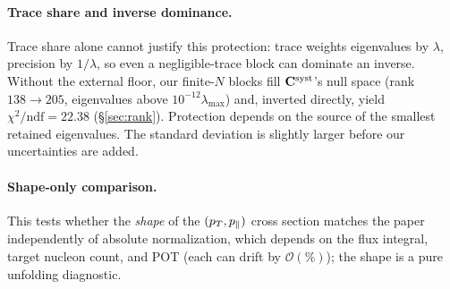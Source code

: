 \paragraph{Trace share and inverse dominance.} Trace share alone cannot justify this protection: trace weights eigenvalues by $\lambda$, precision by $1/\lambda$, so even a negligible-trace block can dominate an inverse. Without the external floor, our finite-$N$ blocks fill $\mathbf{C}^{\text{syst}}$'s null space (rank $138\to205$, eigenvalues above $10^{-12}\lambda_{\max}$) and, inverted directly, yield $\chi^{2}/\mathrm{ndf}=22.38$ (\S\ref{sec:rank}). Protection depends on the source of the smallest retained eigenvalues. The standard deviation is slightly larger before our uncertainties are added.

\paragraph{Shape-only comparison.} This tests whether the \emph{shape} of the $(p_{T},p_{\parallel})$ cross section matches the paper independently of absolute normalization, which depends on the flux integral, target nucleon count, and POT (each can drift by $\mathcal{O}(\%)$); the shape is a pure unfolding diagnostic.

